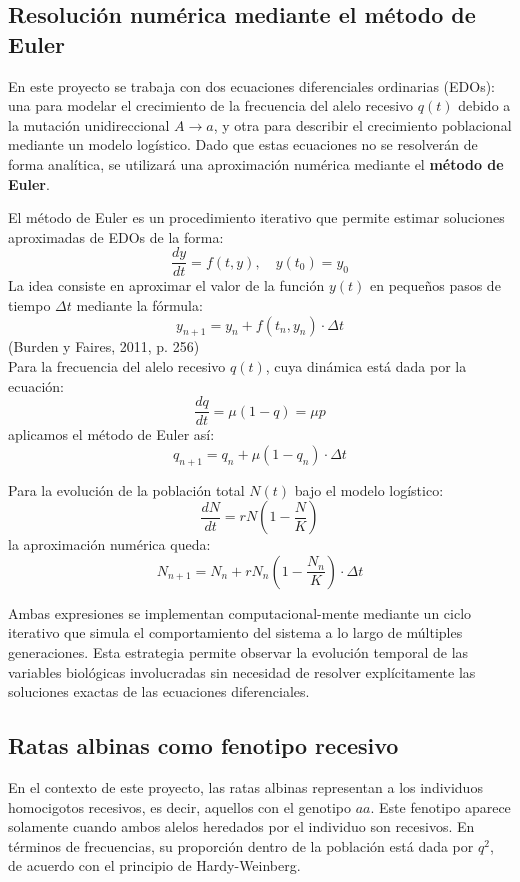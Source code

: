 \documentclass[12pt]{article}
\begin{document}
\subsection*{Resolución numérica mediante el método de Euler}

En este proyecto se trabaja con dos ecuaciones diferenciales ordinarias (EDOs): una para modelar el crecimiento de la frecuencia del alelo recesivo $q(t)$ debido a la mutación unidireccional $A \rightarrow a$, y otra para describir el crecimiento poblacional mediante un modelo logístico. Dado que estas ecuaciones no se resolverán de forma analítica, se utilizará una aproximación numérica mediante el \textbf{método de Euler}.

El método de Euler es un procedimiento iterativo que permite estimar soluciones aproximadas de EDOs de la forma:
\[
\frac{dy}{dt} = f(t, y), \quad y(t_0) = y_0
\]
La idea consiste en aproximar el valor de la función $y(t)$ en pequeños pasos de tiempo $\Delta t$ mediante la fórmula:
\[
y_{n+1} = y_n + f(t_n, y_n) \cdot \Delta t
\]
(Burden y Faires, 2011, p. 256)\\
Para la frecuencia del alelo recesivo $q(t)$, cuya dinámica está dada por la ecuación:
\[
\frac{dq}{dt} = \mu (1 - q) = \mu p
\]
aplicamos el método de Euler así:
\[
q_{n+1} = q_n + \mu (1 - q_n) \cdot \Delta t
\]

Para la evolución de la población total $N(t)$ bajo el modelo logístico:
\[
\frac{dN}{dt} = rN \left(1 - \frac{N}{K}\right)
\]
la aproximación numérica queda:
\[
N_{n+1} = N_n + rN_n \left(1 - \frac{N_n}{K} \right) \cdot \Delta t
\]

Ambas expresiones se implementan computacional-mente mediante un ciclo iterativo que simula el comportamiento del sistema a lo largo de múltiples generaciones. Esta estrategia permite observar la evolución temporal de las variables biológicas involucradas sin necesidad de resolver explícitamente las soluciones exactas de las ecuaciones diferenciales.
\subsection*{Ratas albinas como fenotipo recesivo}

En el contexto de este proyecto, las ratas albinas representan a los individuos homocigotos recesivos, es decir, aquellos con el genotipo $aa$. Este fenotipo aparece solamente cuando ambos alelos heredados por el individuo son recesivos. En términos de frecuencias, su proporción dentro de la población está dada por $q^2$, de acuerdo con el principio de Hardy-Weinberg.
\end{document}
